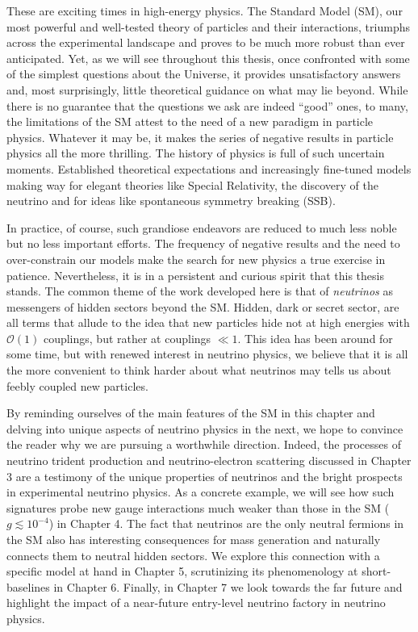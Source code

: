 \graphicspath{{}{introduction/}}

These are exciting times in high-energy physics. The Standard Model (SM), our most powerful and well-tested theory of particles and their interactions, triumphs across the experimental landscape and proves to be much more robust than ever anticipated. Yet, as we will see throughout this thesis, once confronted with some of the simplest questions about the Universe, it provides unsatisfactory answers and, most surprisingly, little theoretical guidance on what may lie beyond. While there is no guarantee that the questions we ask are indeed ``good'' ones, to many, the limitations of the SM attest to the need of a new paradigm in particle physics. Whatever it may be, it makes the series of negative results in particle physics all the more thrilling. The history of physics is full of such uncertain moments. Established theoretical expectations and increasingly fine-tuned models making way for elegant theories like Special Relativity, the discovery of the neutrino and for ideas like spontaneous symmetry breaking (SSB).

In practice, of course, such grandiose endeavors are reduced to much less noble but no less important efforts. The frequency of negative results and the need to over-constrain our models make the search for new physics a true exercise in patience. Nevertheless, it is in a persistent and curious spirit that this thesis stands. The common theme of the work developed here is that of \emph{neutrinos} as messengers of hidden sectors beyond the SM. Hidden, dark or secret sector, are all terms that allude to the idea that new particles hide not at high energies with $\mathscr{O}(1)$ couplings, but rather at couplings $\ll 1$. This idea has been around for some time, but with renewed interest in neutrino physics, we believe that it is all the more convenient to think harder about what neutrinos may tells us about feebly coupled new particles.

By reminding ourselves of the main features of the SM in this chapter and delving into unique aspects of neutrino physics in the next, we hope to convince the reader why we are pursuing a worthwhile direction. Indeed, the processes of neutrino trident production and neutrino-electron scattering discussed in Chapter 3 are a testimony of the unique properties of neutrinos and the bright prospects in experimental neutrino physics. As a concrete example, we will see how such signatures probe new gauge interactions much weaker than those in the SM ($g \lesssim 10^{-4}$) in Chapter 4. The fact that neutrinos are the only neutral fermions in the SM also has interesting consequences for mass generation and naturally connects them to neutral hidden sectors. We explore this connection with a specific model at hand in Chapter 5, scrutinizing its phenomenology at short-baselines in Chapter 6. Finally, in Chapter 7 we look towards the far future and highlight the impact of a near-future entry-level neutrino factory in neutrino physics.

